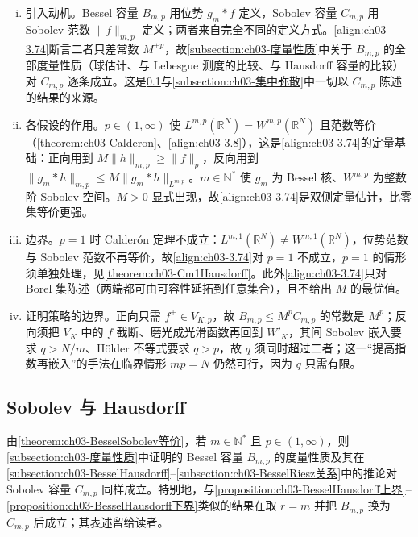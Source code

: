 \documentclass[../../main.tex]{subfiles}%
\begin{document}
\begin{remark}\label{remark:ch03-BesselSobolev动机}
\begin{enumerate}[(i)]
\item 引入动机。Bessel 容量 $B_{m,p}$ 用位势 $g_m*f$ 定义，Sobolev 容量 $C_{m,p}$ 用 Sobolev 范数 $\|f\|_{m,p}$ 定义；两者来自完全不同的定义方式。\eqref{align:ch03-3.74}断言二者只差常数 $M^{\pm p}$，故\cref{subsection:ch03-度量性质}中关于 $B_{m,p}$ 的全部度量性质（球估计、与 Lebesgue 测度的比较、与 Hausdorff 容量的比较）对 $C_{m,p}$ 逐条成立。这是\cref{subsection:ch03-SobolevHausdorff}与\cref{subsection:ch03-集中弥散}中一切以 $C_{m,p}$ 陈述的结果的来源。
\item 各假设的作用。$p\in(1,\infty)$ 使 $L^{m,p}(\mathbb{R}^N)=W^{m,p}(\mathbb{R}^N)$ 且范数等价（\cref{theorem:ch03-Calderon}、\eqref{align:ch03-3.8}），这是\eqref{align:ch03-3.74}的定量基础：正向用到 $M\|h\|_{m,p}\geqslant\|f\|_p$，反向用到 $\|g_m*h\|_{m,p}\leqslant M\|g_m*h\|_{L^{m,p}}$。$m\in\mathbb{N}^*$ 使 $g_m$ 为 Bessel 核、$W^{m,p}$ 为整数阶 Sobolev 空间。$M>0$ 显式出现，故\eqref{align:ch03-3.74}是双侧定量估计，比零集等价更强。
\item 边界。$p=1$ 时 Calderón 定理不成立：$L^{m,1}(\mathbb{R}^N)\neq W^{m,1}(\mathbb{R}^N)$，位势范数与 Sobolev 范数不再等价，故\eqref{align:ch03-3.74}对 $p=1$ 不成立，$p=1$ 的情形须单独处理，见\cref{theorem:ch03-Cm1Hausdorff}。此外\eqref{align:ch03-3.74}只对 Borel 集陈述（两端都可由可容性延拓到任意集合），且不给出 $M$ 的最优值。
\item 证明策略的边界。正向只需 $f^+\in V_{K,p}$，故 $B_{m,p}\leqslant M^pC_{m,p}$ 的常数是 $M^p$；反向须把 $V_K$ 中的 $f$ 截断、磨光成光滑函数再回到 $W'_K$，其间 Sobolev 嵌入要求 $q>N/m$、Hölder 不等式要求 $q>p$，故 $q$ 须同时超过二者；这一“提高指数再嵌入”的手法在临界情形 $mp=N$ 仍然可行，因为 $q$ 只需有限。
\end{enumerate}
\end{remark}

\subsection{Sobolev 与 Hausdorff}\label{subsection:ch03-SobolevHausdorff}

由\cref{theorem:ch03-BesselSobolev等价}，若 $m\in\mathbb{N}^*$ 且 $p\in(1,\infty)$，则\cref{subsection:ch03-度量性质}中证明的 Bessel 容量 $B_{m,p}$ 的度量性质及其在\cref{subsection:ch03-BesselHausdorff}--\cref{subsection:ch03-BesselRiesz关系}中的推论对 Sobolev 容量 $C_{m,p}$ 同样成立。特别地，与\cref{proposition:ch03-BesselHausdorff上界}--\cref{proposition:ch03-BesselHausdorff下界}类似的结果在取 $r=m$ 并把 $B_{m,p}$ 换为 $C_{m,p}$ 后成立；其表述留给读者。
\end{document}
